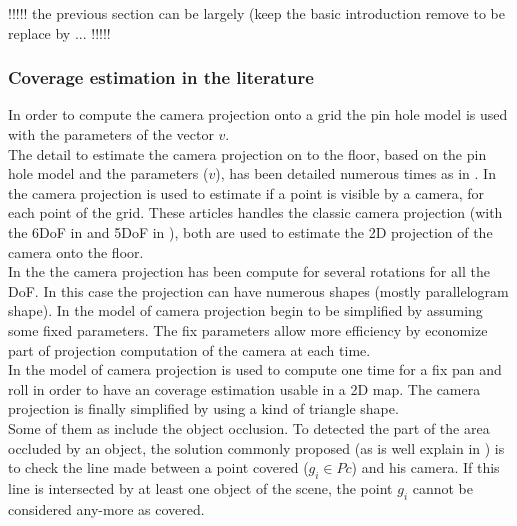 !!!!! the previous section can be largely (keep the basic introduction remove to be replace by ... !!!!!
\fi
\subsubsection{Coverage estimation in the literature}

 In order to compute the camera projection onto a grid the pin hole model is used with the parameters of the vector $v$.\\
The detail to estimate the camera projection on to the floor, based on the pin hole model and the parameters ($v$), has been detailed numerous times as in \cite{193*fu2014,181*wang2017,165*jiang2010}. In \cite{193*fu2014,181*wang2017,165*jiang2010} the camera projection is used to estimate if a point is visible by a camera, for each point of the grid. These articles handles the classic camera projection (with the 6DoF in \citep{193*fu2014} and 5DoF in \citep{181*wang2017}), both are used to estimate the 2D projection of the camera onto the floor. \\
In the \citep{193*fu2014} the camera projection has been compute for several rotations for all the DoF. In this case the projection can have numerous shapes (mostly parallelogram shape).
In \citep{181*wang2017} the model of camera projection begin to be simplified by assuming some fixed parameters. The fix parameters allow more efficiency by economize part of projection computation of the camera at each time.  \\
In \citep{165*jiang2010} the model of camera projection is used to compute one time for a fix pan and roll in order to have an coverage estimation usable in a 2D map. The camera projection is finally simplified by using a kind of triangle shape.\\
 Some of them as \citep{165*jiang2010,181*wang2017,141*akbarzadeh2013} include the object occlusion. To detected the part of the area occluded by an object, the solution commonly proposed (as is well explain in  \citep{181*wang2017}) is to check the line  made between a point covered ($g_i \in Pc$) and his camera. If this line is intersected by at least one object of the scene, the point $g_i$ cannot be considered any-more as covered. 

